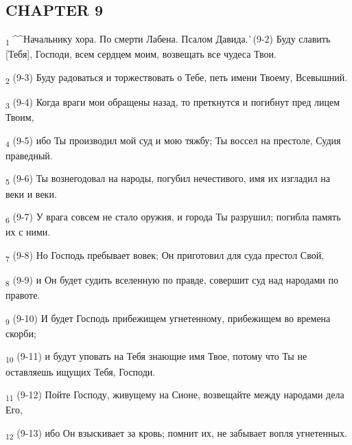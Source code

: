 \subsection{CHAPTER 9}
\begin{tcolorbox}
\textsubscript{1} ^^Начальнику хора. По смерти Лабена. Псалом Давида.^^ (9-2) Буду славить [Тебя], Господи, всем сердцем моим, возвещать все чудеса Твои.
\end{tcolorbox}
\begin{tcolorbox}
\textsubscript{2} (9-3) Буду радоваться и торжествовать о Тебе, петь имени Твоему, Всевышний.
\end{tcolorbox}
\begin{tcolorbox}
\textsubscript{3} (9-4) Когда враги мои обращены назад, то преткнутся и погибнут пред лицем Твоим,
\end{tcolorbox}
\begin{tcolorbox}
\textsubscript{4} (9-5) ибо Ты производил мой суд и мою тяжбу; Ты воссел на престоле, Судия праведный.
\end{tcolorbox}
\begin{tcolorbox}
\textsubscript{5} (9-6) Ты вознегодовал на народы, погубил нечестивого, имя их изгладил на веки и веки.
\end{tcolorbox}
\begin{tcolorbox}
\textsubscript{6} (9-7) У врага совсем не стало оружия, и города Ты разрушил; погибла память их с ними.
\end{tcolorbox}
\begin{tcolorbox}
\textsubscript{7} (9-8) Но Господь пребывает вовек; Он приготовил для суда престол Свой,
\end{tcolorbox}
\begin{tcolorbox}
\textsubscript{8} (9-9) и Он будет судить вселенную по правде, совершит суд над народами по правоте.
\end{tcolorbox}
\begin{tcolorbox}
\textsubscript{9} (9-10) И будет Господь прибежищем угнетенному, прибежищем во времена скорби;
\end{tcolorbox}
\begin{tcolorbox}
\textsubscript{10} (9-11) и будут уповать на Тебя знающие имя Твое, потому что Ты не оставляешь ищущих Тебя, Господи.
\end{tcolorbox}
\begin{tcolorbox}
\textsubscript{11} (9-12) Пойте Господу, живущему на Сионе, возвещайте между народами дела Его,
\end{tcolorbox}
\begin{tcolorbox}
\textsubscript{12} (9-13) ибо Он взыскивает за кровь; помнит их, не забывает вопля угнетенных.
\end{tcolorbox}
